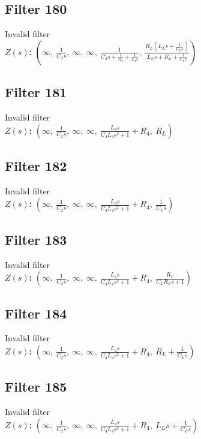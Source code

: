 \documentclass{article}
\begin{document}
\subsection*{Filter 180}
Invalid filter \\ 
\textbf{$Z(s)$:} $\left( \infty, \  \frac{1}{C_{2} s}, \  \infty, \  \infty, \  \frac{1}{C_{4} s + \frac{1}{R_{4}} + \frac{1}{L_{4} s}}, \  \frac{R_{L} \left(L_{L} s + \frac{1}{C_{L} s}\right)}{L_{L} s + R_{L} + \frac{1}{C_{L} s}}\right)$ \\ 
\subsection*{Filter 181}
Invalid filter \\ 
\textbf{$Z(s)$:} $\left( \infty, \  \frac{1}{C_{2} s}, \  \infty, \  \infty, \  \frac{L_{4} s}{C_{4} L_{4} s^{2} + 1} + R_{4}, \  R_{L}\right)$ \\ 
\subsection*{Filter 182}
Invalid filter \\ 
\textbf{$Z(s)$:} $\left( \infty, \  \frac{1}{C_{2} s}, \  \infty, \  \infty, \  \frac{L_{4} s}{C_{4} L_{4} s^{2} + 1} + R_{4}, \  \frac{1}{C_{L} s}\right)$ \\ 
\subsection*{Filter 183}
Invalid filter \\ 
\textbf{$Z(s)$:} $\left( \infty, \  \frac{1}{C_{2} s}, \  \infty, \  \infty, \  \frac{L_{4} s}{C_{4} L_{4} s^{2} + 1} + R_{4}, \  \frac{R_{L}}{C_{L} R_{L} s + 1}\right)$ \\ 
\subsection*{Filter 184}
Invalid filter \\ 
\textbf{$Z(s)$:} $\left( \infty, \  \frac{1}{C_{2} s}, \  \infty, \  \infty, \  \frac{L_{4} s}{C_{4} L_{4} s^{2} + 1} + R_{4}, \  R_{L} + \frac{1}{C_{L} s}\right)$ \\ 
\subsection*{Filter 185}
Invalid filter \\ 
\textbf{$Z(s)$:} $\left( \infty, \  \frac{1}{C_{2} s}, \  \infty, \  \infty, \  \frac{L_{4} s}{C_{4} L_{4} s^{2} + 1} + R_{4}, \  L_{L} s + \frac{1}{C_{L} s}\right)$ \\ 
\end{document}
